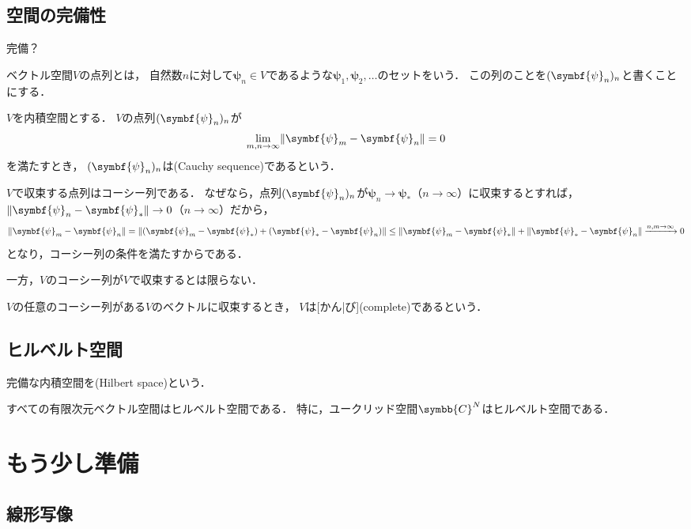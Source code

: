 \documentclass[
]{sotsu}
\newcommand{\bpsi}{\symbf{\psi}}
\begin{document}
\subsection{空間の完備性}

完備？

ベクトル空間$V$の点列とは，
自然数$n$に対して$\bpsi_n \in V$であるような$\bpsi_1, \bpsi_2, \dots$のセットをいう．
この列のことを$\sequ{\bpsi_n}[n]$と書くことにする．

$V$を内積空間とする．
$V$の点列$\sequ{\bpsi_n}[n]$が
\begin{equation*}
    \lim_{m, n \to \infty} \norm{\bpsi_m - \bpsi_n} = 0
\end{equation*}
を満たすとき，
$\sequ{\bpsi_n}[n]$は(Cauchy sequence)であるという．

$V$で収束する点列はコーシー列である．
なぜなら，点列$\sequ{\bpsi_n}[n]$が$\bpsi_n \to \bpsi_*$（$n \to \infty$）に収束するとすれば，
$\norm{\bpsi_n - \bpsi_*} \to 0$（$n \to \infty$）だから，
\begin{equation*}
    \norm{\bpsi_m - \bpsi_n}
    = \norm{(\bpsi_m - \bpsi_*) + (\bpsi_* - \bpsi_n)}
    \leq \norm{\bpsi_m - \bpsi_*} + \norm{\bpsi_* - \bpsi_n}
    \xrightarrow{n, m \to \infty} 0
\end{equation*}
となり，コーシー列の条件を満たすからである．

一方，$V$のコーシー列が$V$で収束するとは限らない．

$V$の任意のコーシー列がある$V$のベクトルに収束するとき，
$V$は[かん|び](complete)であるという．





\subsection{ヒルベルト空間}

完備な内積空間を(Hilbert space)という．

すべての有限次元ベクトル空間はヒルベルト空間である．
特に，ユークリッド空間$\symbb{C}^N$はヒルベルト空間である．




\section{もう少し準備}

\subsection{線形写像}
\end{document}
